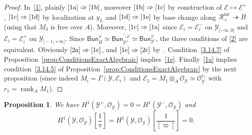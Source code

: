 \documentclass[11pt]{article}
\newtheorem{prop}[theo]{Proposition}
\theoremstyle{definition}
\numberwithin{equation}{section}
\numberwithin{figure}{section}
\numberwithin{table}{section}
\newcommand{\Bun}{\mathsf{Bun}}
\DeclareMathOperator{\rank}{rank}
\begin{document}
\begin{proof}
In~\eqref{1}, plainly $\eqref{1a}\Rightarrow\eqref{1b}$, moreover $\eqref{1b}\Rightarrow\eqref{1c}$ by construction of $\mathscr{E}\mapsto\mathscr{E}^{+}$, $\eqref{1c}\Rightarrow\eqref{1d}$ by localization at $y_{L}$ and $\eqref{1d}\Rightarrow\eqref{1e}$ by base change along $\mathscr{R}_{+}^{\mathrm{int}}\twoheadrightarrow\overline{B}$ (using that $M_{3}$ is free over $A$). Moreover, $\eqref{1c}\Rightarrow\eqref{1a}$ since $\mathscr{E}_{i}=\mathscr{E}_{i}^{-}$ on $\mathscr{Y}_{[-\infty,0[}$ and $\mathscr{E}_{i}=\mathscr{E}_{i}^{+}$ on $\mathscr{Y}_{]-1,+\infty]}$. Since $\Bun_{\overline{B}}^{\varphi}\simeq\Bun_{\mathscr{Y}^{+}}^{\prime,\varphi}\simeq\Bun_{\mathscr{Y}^{\circ}}^{\varphi}$, the three conditions of \eqref{2} are equivalent. Obviously $\eqref{2a}\Rightarrow\eqref{1c}$, and $\eqref{1e}\Rightarrow\eqref{2c}$ by~\cite[\S 11.1]{FaFo15}. Condition~\eqref{3.14.7} of Proposition~\ref{prop:ConditionsExactAlgebraic} implies~\eqref{1e}. Finally~\eqref{1a} implies condition~\eqref{3.14.5} of Proposition~\ref{prop:ConditionsExactAlgebraic} by the next proposition (since indeed $M_{i}=\Gamma(\mathscr{Y},\mathscr{E}_{i})$ and $\mathscr{E}_{1}=M_{1}\otimes_{A}\mathscr{O}_{\mathscr{Y}}\simeq\mathscr{O}_{\mathscr{Y}}^{r_{1}}$ with $r_{1}=\rank_{A}M_{1}$).
\end{proof}

\begin{prop}
We have $H^{1}(\mathscr{Y}^{+},\mathscr{O}_{\mathscr{Y}})=0=H^{1}(\mathscr{Y}^{-},\mathscr{O}_{\mathscr{Y}})$ and
\[
H^{1}(\mathscr{Y},\mathscr{O}_{\mathscr{Y}})\!\left[{\frac{1}{\pi}}\right]=H^{1}(\mathscr{Y},\mathscr{O}_{\mathscr{Y}})\!\left[{\frac{1}{[\varpi]}}\right]=0.
\]
\end{prop}
\end{document}
